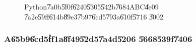 \begin{figure}[th]
\caption{Python\U{7a0b}\U{5f0f}\U{6240}\U{5305}\U{542b}\U{7684}ABC\U{4e09}%
\U{7a2e}\U{59ff}\U{614b}\U{89e3}\U{7b97}\U{6cd5}\U{793a}\U{610f}\U{5716}%
\U{3002}}
\label{ABCmethodsIllustration}
\begin{center}
 
\end{center}
\end{figure}

\bigskip

\subsubsection{A\U{65b9}\U{6cd5}\U{ff1a}\U{8f49}\U{52d5}\U{7a4d}\U{5206}%
\U{5668}\U{539f}\U{7406}}

